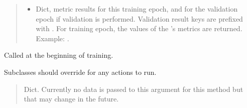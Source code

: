 \documentclass[letterpaper,10pt,english]{sphinxmanual}
\begin{document}
\begin{fulllineitems}
\begin{fulllineitems}
\begin{quote}
\begin{description}
\begin{itemize}
\item {} 
\sphinxAtStartPar
{} \textendash{} Dict, metric results for this training epoch, and for the
validation epoch if validation is performed. Validation result
keys are prefixed with . For training epoch, the values of
the ’s metrics are returned. Example:
.

\end{itemize}

\end{description}\end{quote}

\end{fulllineitems}


\begin{fulllineitems}
\label{\detokenize{beyondml.tflow.utils:beyondml.tflow.utils.utils.ActiveSparsification.on_train_begin}}
\pysigstartsignatures
{}
\pysigstopsignatures
\sphinxAtStartPar
Called at the beginning of training.

\sphinxAtStartPar
Subclasses should override for any actions to run.
\begin{quote}\begin{description}
\sphinxAtStartPar
{} \textendash{} Dict. Currently no data is passed to this argument for this
method but that may change in the future.

\end{description}\end{quote}

\end{fulllineitems}


\end{fulllineitems}

\end{document}
